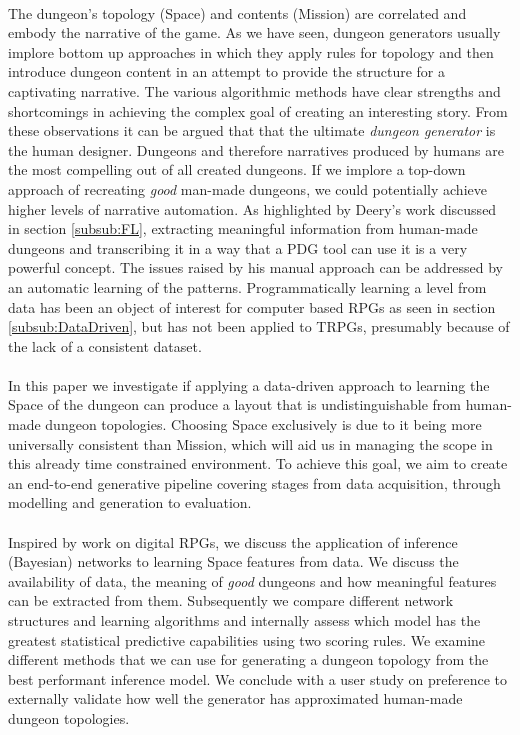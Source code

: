 \documentclass{UoYCSproject}
\begin{document}
\paragraph{}
The dungeon’s topology (Space) and contents (Mission) are correlated and embody the narrative of the game. As we have seen, dungeon generators usually implore bottom up approaches in which they apply rules for topology and then introduce dungeon content in an attempt to provide the structure for a captivating narrative. The various algorithmic methods have clear strengths and shortcomings in achieving the complex goal of creating an interesting story. From these observations it can be argued that that the ultimate \textit{dungeon generator} is the human designer. Dungeons and therefore narratives produced by humans are the most compelling out of all created dungeons. If we implore a top-down approach of recreating \textit{good} man-made dungeons, we could potentially achieve higher levels of narrative automation. As highlighted by Deery's work discussed in section \ref{subsub:FL}, extracting meaningful information from human-made dungeons and transcribing it in a way that a PDG tool can use it is a very powerful concept. The issues raised by his manual approach can be addressed by an automatic learning of the patterns. Programmatically learning a level from data has been an object of interest for computer based RPGs as seen in section \ref{subsub:DataDriven}, but has not been applied to TRPGs, presumably because of the lack of a consistent dataset.

\paragraph{}
In this paper we investigate if applying a data-driven approach to learning the Space of the dungeon can produce a layout that is undistinguishable from human-made dungeon topologies. Choosing Space exclusively is due to it being more universally consistent than Mission, which will aid us in managing the scope in this already time constrained environment. To achieve this goal, we aim to create an end-to-end generative pipeline covering stages from data acquisition, through modelling and generation to evaluation.

\paragraph{}
Inspired by work on digital RPGs, we discuss the application of inference (Bayesian) networks to learning Space features from data. We discuss the availability of data, the meaning of \textit{good} dungeons and how meaningful features can be extracted from them. Subsequently we compare different network structures and learning algorithms and internally assess which model has the greatest statistical predictive capabilities using two scoring rules. We examine different methods that we can use for generating a dungeon topology from the best performant inference model. We conclude with a user study on preference to externally validate how well the generator has approximated human-made dungeon topologies.
\end{document}
